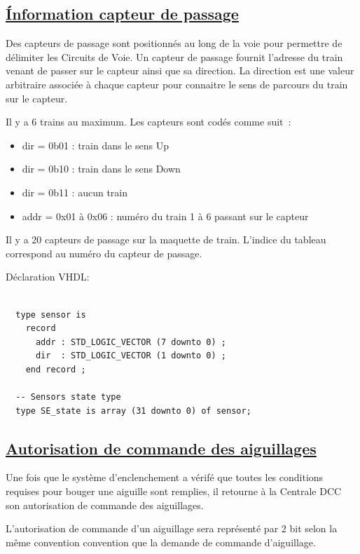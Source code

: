 \subsection{\underline{\'Information capteur de passage}}
\label{sec:ixl_cdv}

Des capteurs de passage sont positionnés au long de la voie pour 
permettre de délimiter les Circuits de Voie. Un capteur de passage
fournit l'adresse du train venant de passer sur le capteur ainsi que
sa direction. La direction est une valeur arbitraire associée à 
chaque capteur pour connaitre le sens de parcours du train sur le capteur.


Il y a 6 trains au maximum. Les capteurs sont codés comme suit~:
\begin{itemize}
  \item dir = 0b01 : train dans le sens Up
  \item dir = 0b10 : train dans le sens Down
  \item dir = 0b11 : aucun train
  \item addr = 0x01 à 0x06 : numéro du train 1 à 6 passant sur le capteur
\end{itemize}  

Il y a 20 capteurs de passage sur la maquette de train. L'indice du
tableau correspond au numéro du capteur de passage.

\medskip
\medskip
Déclaration VHDL:
\begin{lstlisting}[style=vhdl]

  type sensor is
    record
      addr : STD_LOGIC_VECTOR (7 downto 0) ;
      dir  : STD_LOGIC_VECTOR (1 downto 0) ;
    end record ;

  -- Sensors state type
  type SE_state is array (31 downto 0) of sensor;

\end{lstlisting}


\subsection{\underline{Autorisation de commande des aiguillages}}
\label{sec:ixl_dem_aig}

Une fois que le système d'enclenchement a vérifé que toutes les
conditions requises pour bouger une aiguille sont remplies, il 
retourne à la Centrale DCC son autorisation de commande des aiguillages.

L'autorisation de commande d'un aiguillage sera représenté par
2 bit selon la même convention convention que la demande de commande
d'aiguillage.

